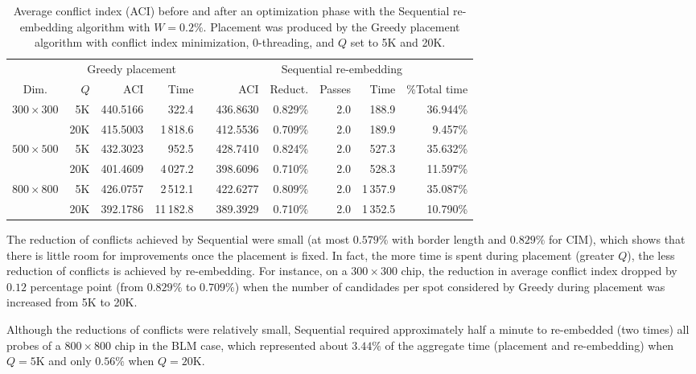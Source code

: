 \begin{table}[ht]\centering
\caption{\label{tab:sequential_ci}
  Average conflict index (ACI) before and after an optimization phase with the
  Sequential re-embedding algorithm with $W=0.2\%$. Placement was produced by
  the Greedy placement algorithm with conflict index minimization,
  $0$-threading, and $Q$ set to 5K and 20K.}
\footnotesize{
\begin{tabular}{crrrlrrrrr}
\vspace{1pt}
     & \multicolumn{3}{c}{Greedy placement} & & \multicolumn{5}{c}{Sequential re-embedding} \\ \cline{2-4} \cline{6-10}
\vspace{1pt}
Dim. & $Q$ & ACI & Time & & ACI & Reduct. & Passes & Time & \%Total time \\
\hline
$300\times 300$ &  5K & 440.5166 &     322.4 & & 436.8630 & 0.829\% & 2.0 &    188.9 & 36.944\% \\
                & 20K & 415.5003 &  1\,818.6 & & 412.5536 & 0.709\% & 2.0 &    189.9 &  9.457\% \\
\hline
$500\times 500$ &  5K & 432.3023 &     952.5 & & 428.7410 & 0.824\% & 2.0 &    527.3 & 35.632\% \\
                & 20K & 401.4609 &  4\,027.2 & & 398.6096 & 0.710\% & 2.0 &    528.3 & 11.597\% \\
\hline
$800\times 800$ &  5K & 426.0757 &  2\,512.1 & & 422.6277 & 0.809\% & 2.0 & 1\,357.9 & 35.087\% \\
                & 20K & 392.1786 & 11\,182.8 & & 389.3929 & 0.710\% & 2.0 & 1\,352.5 & 10.790\% \\
\hline
\end{tabular}}
\end{table}

The reduction of conflicts achieved by Sequential were small (at most $0.579\%$
with border length and $0.829\%$ for CIM), which shows that there is little room
for improvements once the placement is fixed. In fact, the more time is spent
during placement (greater $Q$), the less reduction of conflicts is achieved by
re-embedding. For instance, on a $300\times 300$ chip, the reduction in average
conflict index dropped by $0.12$ percentage point (from $0.829\%$ to $0.709\%$)
when the number of candidades per spot considered by Greedy during placement was
increased from 5K to 20K.

Although the reductions of conflicts were relatively small, Sequential required
approximately half a minute to re-embedded (two times) all probes of a
$800\times 800$ chip in the BLM case, which represented about $3.44\%$ of the
aggregate time (placement and re-embedding) when $Q=5$K and only $0.56\%$ when
$Q=20$K.

